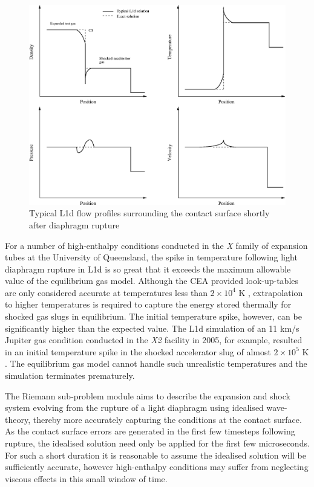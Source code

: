 \documentclass[a4paper,10pt]{article}
\begin{document}
\begin{figure}[ht]
\centering
\includegraphics[scale=0.7]{figs/cs_error.eps}
\caption{Typical L1d flow profiles surrounding the contact surface shortly after diaphragm rupture}
\label{fig:cs_error}
\end{figure}

\par \medskip

For a number of high-enthalpy conditions conducted in the \emph{X} family of expansion tubes at the University of Queensland, the spike in temperature following light diaphragm rupture in L1d is so great that it exceeds the maximum allowable value of the equilibrium gas model.  Although the CEA provided look-up-tables are only considered accurate at temperatures less than $2 \times 10^{4}$ K \cite{gordon}, extrapolation to higher temperatures is required to capture the energy stored thermally for shocked gas slugs in equilibrium.  The initial temperature spike, however, can be significantly higher than the expected value.  The L1d simulation of an 11 km/s Jupiter gas condition conducted in the \emph{X2} facility in 2005, for example, resulted in an initial temperature spike in the shocked accelerator slug of almost $2 \times 10^{5}$ K \cite{my_ug_thesis}.  The equilibrium gas model cannot handle such unrealistic temperatures and the simulation terminates prematurely.

\par \medskip

The Riemann sub-problem module aims to describe the expansion and shock system evolving from the rupture of a light diaphragm using idealised wave-theory, thereby more accurately capturing the conditions at the contact surface.  As the contact surface errors are generated in the first few timesteps following rupture, the idealised solution need only be applied for the first few microseconds.  For such a short duration it is reasonable to assume the idealised solution will be sufficiently accurate, however high-enthalpy conditions may suffer from neglecting viscous effects in this small window of time.
\end{document}
